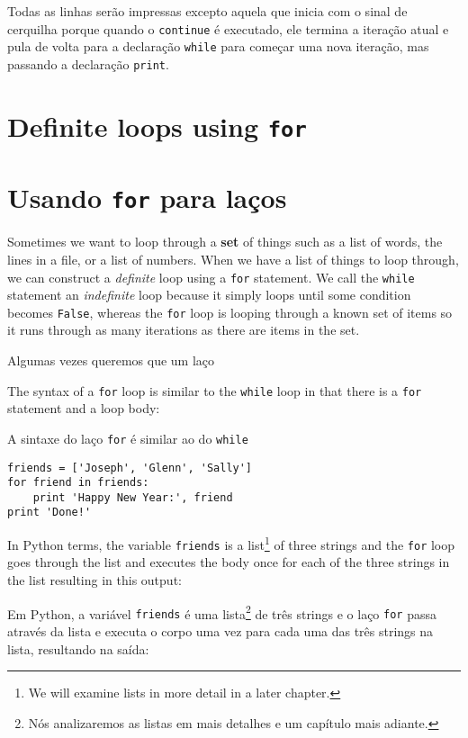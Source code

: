 %
Todas as linhas serão impressas excepto aquela que inicia com o sinal de
cerquilha porque quando o {\tt continue} é executado, ele termina a iteração
atual e pula de volta para a declaração {\tt while} para começar uma nova
iteração, mas passando a declaração {\tt print}.

\section{Definite loops using {\tt for} }
\section{Usando {\tt for} para laços}

Sometimes we want to loop through a {\bf set} of things such 
as a list of words, the lines in a file, or a list of numbers.
When we have a list of things to loop through, we can
construct a \emph{definite} loop using a {\tt for} statement.
We call the {\tt while} statement an \emph{indefinite} loop
because it simply loops until some condition becomes {\tt False}, 
whereas the {\tt for} loop is looping through a known
set of items so it runs through as many iterations as there
are items in the set.

Algumas vezes queremos que um laço 

The syntax of a {\tt for} loop is similar to the {\tt while} loop
in that there is a {\tt for} statement and a loop body:

A sintaxe do laço {\tt for} é similar ao do {\tt while} 

\beforeverb
\begin{verbatim}
friends = ['Joseph', 'Glenn', 'Sally']
for friend in friends:
    print 'Happy New Year:', friend
print 'Done!'
\end{verbatim}
\afterverb
%
In Python terms, 
the variable {\tt friends} is a list\footnote{We will 
examine lists in more detail in a later chapter.} 
of three strings and the {\tt for}
loop goes through the list and executes the body once
for each of the three strings in the list resulting in this output:

%
Em Python, a variável {\tt friends} é uma lista\footnote{Nós analizaremos as
	listas em mais detalhes e um capítulo mais adiante.} de três strings e o
laço {\tt for} passa através da lista e executa o corpo uma vez para cada uma
das três strings na lista, resultando na saída:

